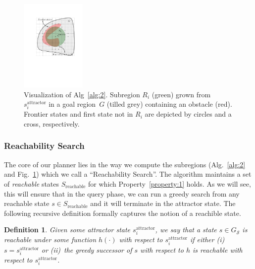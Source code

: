 \documentclass[letterpaper]{article} %
\newcommand{\calS}{\ensuremath{\mathcal{S}}\xspace}
\newcommand{\sAttract}{\ensuremath{s^{\text{attractor}}_i}\xspace}
\newtheorem{definition}{Definition}
\begin{document}
\begin{figure}[tb]
  \centering
  	\includegraphics[width=0.28\textwidth]{Alg2.pdf}
  \caption{
  Visualization of Alg~\ref{alg:2}. Subregion $R_i$ (green) grown from $\sAttract$ in a goal region~$G$ (tilled grey) containing an obstacle (red).
  Frontier states  and first state not in $R_i$ are depicted by circles and a cross, respectively.
}
   	\label{fig:alg2}
\end{figure}

\subsubsection{Reachability Search}
The core of our planner lies in the way we compute the subregions (Alg.~\ref{alg:2} and Fig.~\ref{fig:alg2}) which we call a ``Reachability Search''. The algorithm maintains a set of \emph{reachable} states $S_{\text{reachable}}$ for which Property~\ref{property:1} holds.
As we will see, this will ensure that in the query phase, we can run a greedy search from any reachable state $s \in S_{\text{reachable}}$ and it will terminate in the attractor state. 
%
The following recursive definition formally captures the notion of a reachible state.

\vspace{2mm}
\begin{definition}
	Given some attractor state \sAttract, we say that a state $s \in G_\calS$ is reachable under some function $h(\cdot)$ with respect to \sAttract if either
	(i)~$s = \sAttract$ or
	(ii)~the greedy successor of $s$ with respect to $h$ is reachable with respect to \sAttract.
\end{definition}

\end{document}
